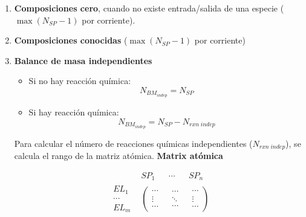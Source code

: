             
            \begin{enumerate}
                \item \textbf{Composiciones cero}, cuando no existe entrada/salida de una especie (\(\max({N_{SP} - 1})\) por corriente).
                \item \textbf{Composiciones conocidas} (\(\max({N_{SP} - 1})\) por corriente)
                \item \textbf{Balance de masa independientes}
                \begin{itemize}
                    \item Si no hay reacción química:
                    \[N_{BM_{indep}} = N_{SP}\]
                    
                    \item Si hay reacción química:
                    \[N_{BM_{indep}} = N_{SP} - N_{rxn\;indep}\]
                \end{itemize}
                Para calcular el número de reacciones químicas independientes (\(N_{rxn\;indep}\)), se calcula el rango de la matriz atómica.
                \textbf{Matrix atómica}
                
                \[
                \begin{matrix}
                     & SP_{1} & \cdots & SP_{n} \\
                    \begin{array}{c}
                        EL_{1} \\
                        \cdots \\
                        EL_{m}
                    \end{array} & \left (
                    \begin{array}{c}
                        \cdots \\
                        \vdots \\
                        \cdots
                    \end{array} \right . &
                    \begin{array}{c}
                        \cdots \\
                        \ddots \\
                        \cdots
                    \end{array} & \left .
                    \begin{array}{c}
                        \cdots \\
                        \vdots \\
                        \cdots
                    \end{array} \right )
                \end{matrix}
                \]
                

\end{enumerate}

